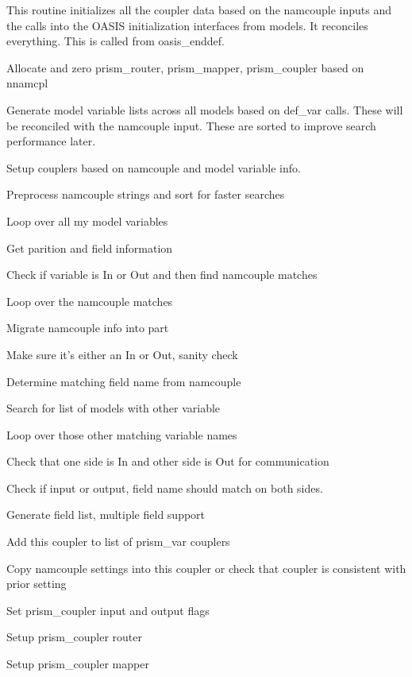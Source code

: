 This routine initializes all the coupler data based on the namcouple inputs and the calls into the O\+A\+S\+I\+S initialization interfaces from models. It reconciles everything. This is called from oasis\+\_\+enddef. 
\begin{DoxyItemize}
\item Allocate and zero prism\+\_\+router, prism\+\_\+mapper, prism\+\_\+coupler based on nnamcpl
\item Generate model variable lists across all models based on def\+\_\+var calls. These will be reconciled with the namcouple input. These are sorted to improve search performance later.
\item Setup couplers based on namcouple and model variable info.
\item Preprocess namcouple strings and sort for faster searches
\item Loop over all my model variables
\begin{DoxyItemize}
\item Get parition and field information
\item Check if variable is In or Out and then find namcouple matches
\item Loop over the namcouple matches
\begin{DoxyItemize}
\item Migrate namcouple info into part
\item Make sure it's either an In or Out, sanity check
\item Determine matching field name from namcouple
\item Search for list of models with other variable
\item Loop over those other matching variable names
\begin{DoxyItemize}
\item Check that one side is In and other side is Out for communication
\item Check if input or output, field name should match on both sides.
\item Generate field list, multiple field support
\item Add this coupler to list of prism\+\_\+var couplers
\item Copy namcouple settings into this coupler or check that coupler is consistent with prior setting
\item Set prism\+\_\+coupler input and output flags
\item Setup prism\+\_\+coupler router
\item Setup prism\+\_\+coupler mapper

\end{DoxyItemize}
\end{DoxyItemize}
\end{DoxyItemize}
\end{DoxyItemize}

